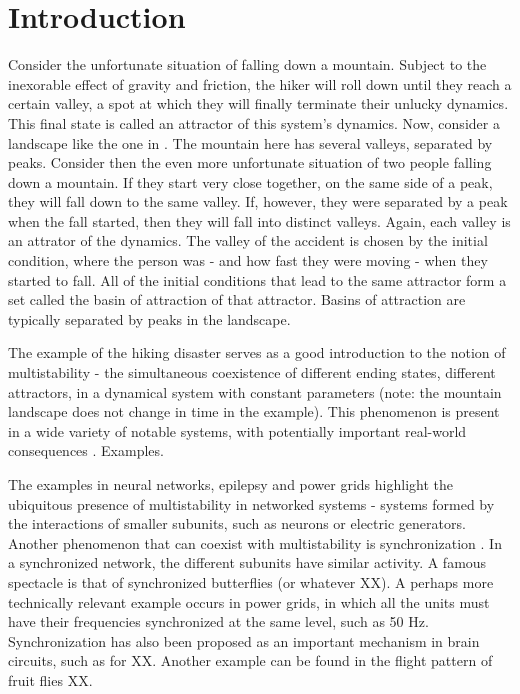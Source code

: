 \chapter{Introduction}
Consider the unfortunate situation of falling down a mountain. Subject to the inexorable effect of gravity and friction, the hiker will roll down until they reach a certain valley, a spot at which they will finally terminate their unlucky dynamics. This final state is called an attractor of this system's dynamics. Now, consider a landscape like the one in . The mountain here has several valleys, separated by peaks. Consider then the even more unfortunate situation of two people falling down a mountain. If they start very close together, on the same side of a peak, they will fall down to the same valley. If, however, they were separated by a peak when the fall started, then they will fall into distinct valleys. Again, each valley is an attrator of the dynamics. The valley of the accident is chosen by the initial condition, where the person was - and how fast they were moving - when they started to fall. All of the initial conditions that lead to the same attractor form a set called the basin of attraction of that attractor. Basins of attraction are typically separated by peaks in the landscape.
%
\begin{figure}
    \centering
    \label{Landscape with valleys and peaks constitutes an example of multistability for an unfortunate falling person.}
\end{figure}


The example of the hiking disaster serves as a good introduction to the notion of multistability - the simultaneous coexistence of different ending states, different attractors, in a dynamical system with constant parameters (note: the mountain landscape does not change in time in the example). This phenomenon is present in a wide variety of notable systems, with potentially important real-world consequences \cite{}. Examples.

The examples in neural networks, epilepsy and power grids highlight the ubiquitous presence of multistability in networked systems - systems formed by the interactions of smaller subunits, such as neurons or electric generators.  Another phenomenon that can coexist with multistability is synchronization \cite{}. In a synchronized network, the different subunits have similar activity. A famous spectacle is that of synchronized butterflies (or whatever XX). A perhaps more technically relevant example occurs in power grids, in which all the units must have their frequencies synchronized at the same level, such as 50 Hz. Synchronization has also been proposed as an important mechanism in brain circuits, such as for XX. Another example can be found in the flight pattern of fruit flies XX. 

